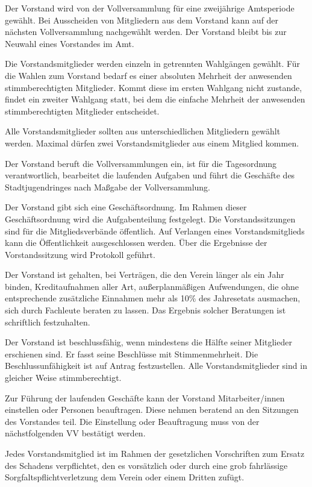 \documentclass[10pt,a4paper,oneside,parskip=half]{scrartcl}
\begin{document}
\begin{contract}
Der Vorstand wird von der Vollversammlung für eine zweijährige Amtsperiode gewählt. Bei Ausscheiden von Mitgliedern aus dem Vorstand kann auf der nächsten Vollversammlung nachgewählt werden. Der Vorstand bleibt bis zur Neuwahl eines Vorstandes im Amt.

Die Vorstandsmitglieder werden einzeln in getrennten Wahlgängen gewählt. Für die Wahlen zum Vorstand bedarf es einer absoluten Mehrheit der anwesenden stimmberechtigten Mitglieder. Kommt diese im ersten Wahlgang nicht zustande, findet ein zweiter Wahlgang statt, bei dem die einfache Mehrheit der anwesenden stimmberechtigten Mitglieder entscheidet.

Alle Vorstandsmitglieder sollten aus unterschiedlichen Mitgliedern gewählt werden. Maximal dürfen zwei Vorstandsmitglieder aus einem Mitglied kommen.

Der Vorstand beruft die Vollversammlungen ein, ist für die Tagesordnung verantwortlich, bearbeitet die laufenden Aufgaben und führt die Geschäfte des Stadtjugendringes nach Maßgabe der Vollversammlung.

Der Vorstand gibt sich eine Geschäftsordnung. Im Rahmen dieser Geschäftsordnung wird die Aufgabenteilung festgelegt. Die Vorstandssitzungen sind für die Mitgliedsverbände öffentlich. Auf Verlangen eines Vorstandsmitglieds kann die Öffentlichkeit ausgeschlossen werden. Über die Ergebnisse der Vorstandssitzung wird Protokoll geführt.

Der Vorstand ist gehalten, bei Verträgen, die den Verein länger als ein Jahr binden, Kreditaufnahmen aller Art, außerplanmäßigen Aufwendungen, die ohne entsprechende zusätzliche Einnahmen mehr als 10\% des Jahresetats ausmachen, sich durch Fachleute beraten zu lassen. Das Ergebnis solcher Beratungen ist schriftlich festzuhalten.

Der Vorstand ist beschlussfähig, wenn mindestens die Hälfte seiner Mitglieder erschienen sind. Er fasst seine Beschlüsse mit Stimmenmehrheit. Die Beschlussunfähigkeit ist auf Antrag festzustellen. Alle Vorstandsmitglieder sind in gleicher Weise stimmberechtigt.

Zur Führung der laufenden Geschäfte kann der Vorstand Mitarbeiter/innen einstellen oder Personen beauftragen. Diese nehmen beratend an den Sitzungen des Vorstandes teil. Die Einstellung oder Beauftragung muss von der nächstfolgenden VV bestätigt werden.

Jedes Vorstandsmitglied ist im Rahmen der gesetzlichen Vorschriften zum Ersatz des Schadens verpflichtet, den es vorsätzlich oder durch eine grob fahrlässige Sorgfaltspflichtverletzung dem Verein oder einem Dritten zufügt.


\end{contract}
\end{document}
